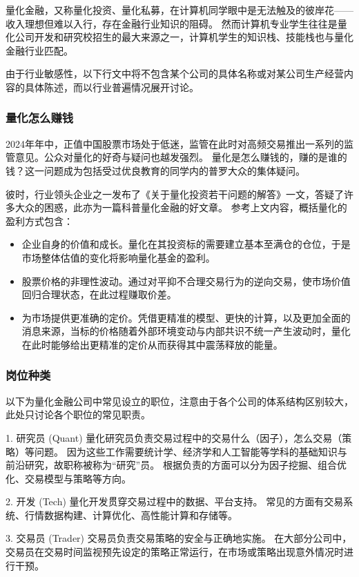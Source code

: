 量化金融，又称量化投资、量化私募，在计算机同学眼中是无法触及的彼岸花——收入理想但难以入行，存在金融行业知识的阻碍。
然而计算机专业学生往往是量化公司开发和研究校招生的最大来源之一，计算机学生的知识栈、技能栈也与量化金融行业匹配。

由于行业敏感性，以下行文中将不包含某个公司的具体名称或对某公司生产经营内容的具体陈述，而以行业普遍情况展开讨论。

\subsubsection{量化怎么赚钱}

2024年年中，正值中国股票市场处于低迷，监管在此时对高频交易推出一系列的监管意见。公众对量化的好奇与疑问也越发强烈。
量化是怎么赚钱的，赚的是谁的钱？这一问题成为包括受过优良教育的同学内的普罗大众的集体疑问。

彼时，行业领头企业之一发布了《关于量化投资若干问题的解答》一文，答疑了许多大众的困惑，此亦为一篇科普量化金融的好文章。
参考上文内容，概括量化的盈利方式包含：
\begin{itemize}
    \item 企业自身的价值和成长。量化在其投资标的需要建立基本至满仓的仓位，于是市场整体估值的变化将影响量化基金的盈利。
    \item 股票价格的非理性波动。通过对平抑不合理交易行为的逆向交易，使市场价值回归合理状态，在此过程赚取价差。
    \item 为市场提供更准确的定价。凭借更精准的模型、更快的计算，以及更加全面的消息来源，当标的价格随着外部环境变动与内部共识不统一产生波动时，量化在此时能够给出更精准的定价从而获得其中震荡释放的能量。
\end{itemize}

\subsubsection{岗位种类}
以下为量化金融公司中常见设立的职位，注意由于各个公司的体系结构区别较大，此处只讨论各个职位的常见职责。

1. 研究员 (Quant)
量化研究员负责交易过程中的交易什么（因子），怎么交易（策略）等问题。
因为这些工作需要统计学、经济学和人工智能等学科的基础知识与前沿研究，故职称被称为“研究”员。
根据负责的方面可以分为因子挖掘、组合优化、交易模型与策略等方向。

2. 开发 (Tech)
量化开发贯穿交易过程中的数据、平台支持。
常见的方面有交易系统、行情数据构建、计算优化、高性能计算和存储等。

3. 交易员 (Trader)
交易员负责交易策略的安全与正确地实施。
在大部分公司中，交易员在交易时间监视预先设定的策略正常运行，在市场或策略出现意外情况时进行干预。


